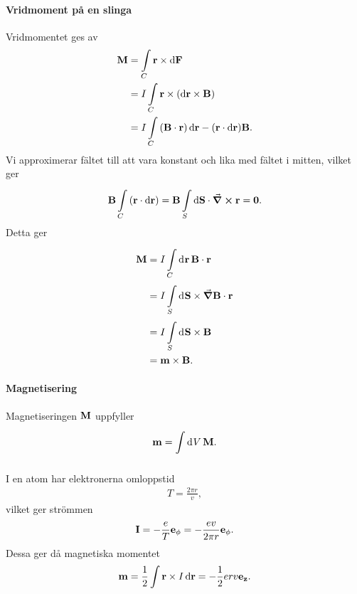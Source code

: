 \paragraph{Vridmoment på en slinga}
Vridmomentet ges av
\begin{align*}
	\vb{M} &= \int\limits_{C}{\vb{r}\times\dd{\vb{F}}} \\
	       &= I\int\limits_{C}{\vb{r}\times(\dd{\vb{r}}\times\vb{B})} \\
	       &= I\int\limits_{C}{(\vb{B}\cdot\vb{r})\dd{\vb{r}} - (\vb{r}\cdot\dd{\vb{r}})\vb{B}}.
\end{align*}
Vi approximerar fältet till att vara konstant och lika med fältet i mitten, vilket ger
\begin{align*}
	\vb{B}\int\limits_{C}{(\vb{r}\cdot\dd{\vb{r}})} = \vb{B}\int\limits_{S}^{}\dd{\vb{\vb{S}}}\cdot \curl{\vb{r}} = \vb{0}.
\end{align*}
Detta ger
\begin{align*}
	\vb{M} &= I\int\limits_{C}^{}\dd[]{\vb{r}}\vb{B}\cdot\vb{r} \\
	       &= I\int\limits_{S}^{}\dd[]{\vb{S}}\times\grad{\vb{B}\cdot\vb{r}} \\
	       &= I\int\limits_{S}^{}\dd[]{\vb{S}}\times\vb{B} \\
	       &= \vb{m}\times\vb{B}.
\end{align*}

\paragraph{Magnetisering}
Magnetiseringen $\vb{M}$ uppfyller
\begin{align*}
	\vb{m} = \int\limits_{}^{}\dd[]{V}\vb{M}.
\end{align*}

I en atom har elektronerna omloppstid
\begin{align*}
	T = \frac{2\pi r}{v},
\end{align*}
vilket ger strömmen
\begin{align*}
	\vb{I} = -\frac{e}{T}\vb{e}_{\vb{\phi}} = -\frac{ev}{2\pi r}\vb{e}_{\vb{\phi}}.
\end{align*}
Dessa ger då magnetiska momentet
\begin{align*}
	\vb{m} = \frac{1}{2}\int{\vb{r}\times I\dd{\vb{r}}} = -\frac{1}{2}erv\vb{e}_{\vb{z}}.
\end{align*}
